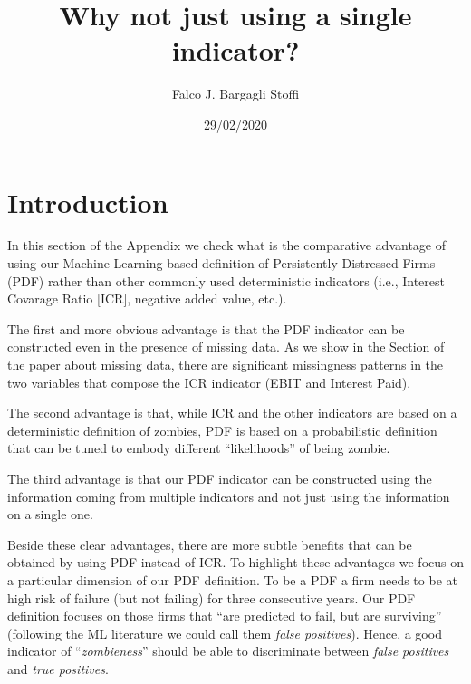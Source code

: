 \documentclass[]{article}
\title{Why not just using a single indicator?}
\author{Falco J. Bargagli Stoffi}
\date{29/02/2020}
\begin{document}
\maketitle

\hypertarget{introduction}{%
\section{Introduction}\label{introduction}}

In this section of the Appendix we check what is the comparative
advantage of using our Machine-Learning-based definition of Persistently
Distressed Firms (PDF) rather than other commonly used deterministic
indicators (i.e., Interest Covarage Ratio {[}ICR{]}, negative added
value, etc.).

\par

The first and more obvious advantage is that the PDF indicator can be
constructed even in the presence of missing data. As we show in the
Section of the paper about missing data, there are significant
missingness patterns in the two variables that compose the ICR indicator
(EBIT and Interest Paid).

\par

The second advantage is that, while ICR and the other indicators are
based on a deterministic definition of zombies, PDF is based on a
probabilistic definition that can be tuned to embody different
``likelihoods'' of being zombie.

\par

The third advantage is that our PDF indicator can be constructed using
the information coming from multiple indicators and not just using the
information on a single one.

\par

Beside these clear advantages, there are more subtle benefits that can
be obtained by using PDF instead of ICR. To highlight these advantages
we focus on a particular dimension of our PDF definition. To be a PDF a
firm needs to be at high risk of failure (but not failing) for three
consecutive years. Our PDF definition focuses on those firms that ``are
predicted to fail, but are surviving'' (following the ML literature we
could call them \textit{false positives}). Hence, a good indicator of
``\textit{zombieness}'' should be able to discriminate between
\textit{false positives} and \textit{true positives}.
\end{document}
